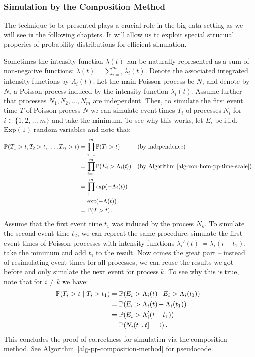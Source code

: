 \documentclass[report.tex]{subfiles}
\begin{document}
\subsubsection{Simulation by the Composition Method}

The technique to be presented plays a crucial role in the big-data
setting as we will see in the following chapters.
It will allow us to exploit special structual properies of probability distributions
for efficient simulation.

Sometimes the intensity function $\lambda(t)$ can be naturally represented
as a sum of non-negative functions: $\lambda(t) = \sum_{i=1}^{m} \lambda_{i}(t)$.
Denote the associated integrated intensity functions by $\Lambda_{i}(t)$.
Let the main Poisson process be $N$, and denote by $N_{i}$ a Poisson process induced
by the intensity function $\lambda_{i}(t)$. Assume further that processes
$N_{1}, N_{2}, \dots, N_{m}$ are independent.
Then, to simulate the first event time $T$ of Poisson process $N$ we can simulate event times
$T_{i}$ of processes $N_{i}$ for $i \in \{1, 2, \dots, m\}$ and take
the minimum.
To see why this works, let $E_{i}$ be i.i.d. $\text{Exp}(1)$ random variables and
note that:
\begin{align*}
  \mathbb{P}\!\left({T_{1} > t, T_{2} > t, \dots, T_{m} > t}\right)
  &= \prod_{i=1}^{m} \mathbb{P}\!\left({T_{i} > t}\right) && \text{(by independence)} \\
  &= \prod_{i=1}^{m} \mathbb{P}\!\left({E_{i} > \Lambda_{i}(t)}\right) && \text{(by Algorithm~\ref{alg-non-hom-pp-time-scale})} \\
  &= \prod_{i=1}^{m} \exp(-\Lambda_{i}(t)) \\
  &= \exp(-\Lambda(t)) \\
  &= \mathbb{P}\!\left({T > t}\right).
\end{align*}
Assume that the first event time $t_{1}$ was induced
by the process $N_{k}$.
To simulate the second event time $t_{2}$, we can repreat the same procedure:
simulate the first event times of Poisson processes with intensity
functions \mbox{$\lambda_{i}'(t) \coloneqq \lambda_{i}(t + t_{1})$},
take the minimum and add $t_{1}$ to the result.
Now comes the great part -- instead of resimulating event times for all
processes, we can reuse the results we got before and only simulate the next
event for process $k$.
To see why this is true, note that for $i \neq k$ we have:
\begin{align*}
\mathbb{P}\!\left({T_{i} > t} \mid {T_{i} > t_{1}}\right)
&= \mathbb{P}\!\left({E_{i} > \Lambda_{i}(t)} \mid {E_{i} > \Lambda_{i}(t_{0})}\right) \\
&= \mathbb{P}\!\left({E_{i} > \Lambda_{i}(t) - \Lambda_{i}(t_{1})}\right) \\
&= \mathbb{P}\!\left({E_{i} > \Lambda_{i}'(t - t_{1})}\right) \\
&= \mathbb{P}\!\left({{N_{i\,}}\!({t_{1}},{t}] = 0}\right).
\end{align*}
This concludes the proof of correctness for simulation via the composition method.
See Algorithm~\ref{alg-pp-composition-method} for pseudocode.
\end{document}
